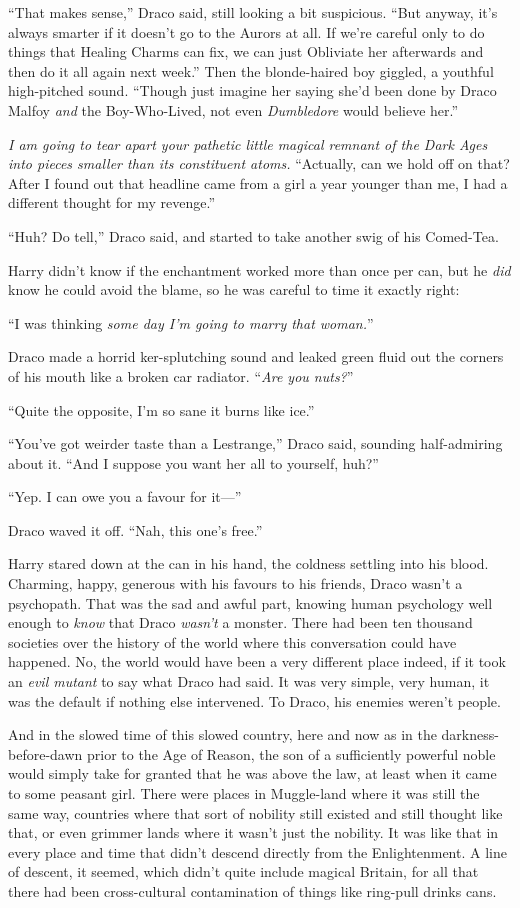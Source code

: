 “That makes sense,” Draco said, still looking a bit suspicious. “But anyway, it’s always smarter if it doesn’t go to the Aurors at all. If we’re careful only to do things that Healing Charms can fix, we can just Obliviate her afterwards and then do it all again next week.” Then the blonde-haired boy giggled, a youthful high-pitched sound. “Though just imagine her saying she’d been done by Draco Malfoy \emph{and} the Boy-Who-Lived, not even \emph{Dumbledore} would believe her.”

\emph{I am going to tear apart your pathetic little magical remnant of the Dark Ages into pieces smaller than its constituent atoms.} “Actually, can we hold off on that? After I found out that headline came from a girl a year younger than me, I had a different thought for my revenge.”

“Huh? Do tell,” Draco said, and started to take another swig of his Comed-Tea.

Harry didn’t know if the enchantment worked more than once per can, but he \emph{did} know he could avoid the blame, so he was careful to time it exactly right:

“I was thinking \emph{some day I’m going to marry that woman.}”

Draco made a horrid ker-splutching sound and leaked green fluid out the corners of his mouth like a broken car radiator. “\emph{Are you nuts?}”

“Quite the opposite, I’m so sane it burns like ice.”

“You’ve got weirder taste than a Lestrange,” Draco said, sounding half-admiring about it. “And I suppose you want her all to yourself, huh?”

“Yep. I can owe you a favour for it—”

Draco waved it off. “Nah, this one’s free.”

Harry stared down at the can in his hand, the coldness settling into his blood. Charming, happy, generous with his favours to his friends, Draco wasn’t a psychopath. That was the sad and awful part, knowing human psychology well enough to \emph{know} that Draco \emph{wasn’t} a monster. There had been ten thousand societies over the history of the world where this conversation could have happened. No, the world would have been a very different place indeed, if it took an \emph{evil mutant} to say what Draco had said. It was very simple, very human, it was the default if nothing else intervened. To Draco, his enemies weren’t people.

And in the slowed time of this slowed country, here and now as in the darkness-before-dawn prior to the Age of Reason, the son of a sufficiently powerful noble would simply take for granted that he was above the law, at least when it came to some peasant girl. There were places in Muggle-land where it was still the same way, countries where that sort of nobility still existed and still thought like that, or even grimmer lands where it wasn’t just the nobility. It was like that in every place and time that didn’t descend directly from the Enlightenment. A line of descent, it seemed, which didn’t quite include magical Britain, for all that there had been cross-cultural contamination of things like ring-pull drinks cans.

